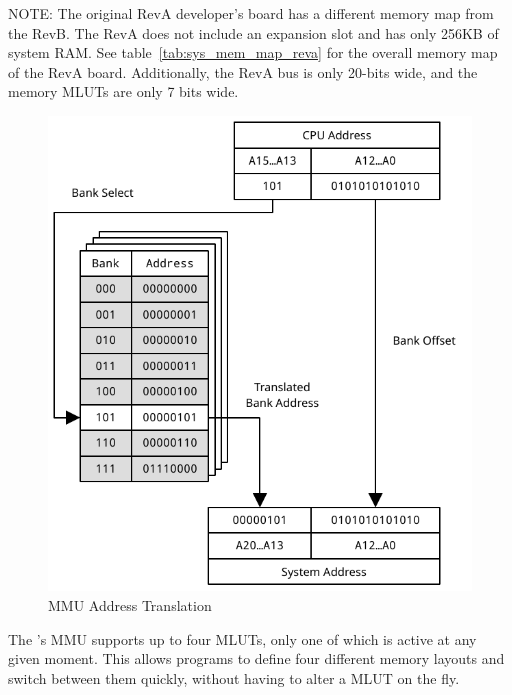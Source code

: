 \begin{leftbar}
NOTE: The original RevA developer's board has a different memory map from the RevB. The RevA does not include an expansion slot and has only 256KB of system RAM. See table~\ref{tab:sys_mem_map_reva} for the overall memory map of the RevA board. Additionally, the RevA bus is only 20-bits wide, and the memory MLUTs are only 7 bits wide.
\end{leftbar}

\begin{figure}[ht]
    \begin{center}
        \includegraphics[scale=0.65]{images/mmu_address_xlate.pdf}
    \end{center}
    \caption{MMU Address Translation}
    \label{fig:mmu_address_xlate}
\end{figure}

The \jr's MMU supports up to four MLUTs, only one of which is active at any given moment. This allows programs to define four different memory layouts and switch between them quickly, without having to alter a MLUT on the fly.

